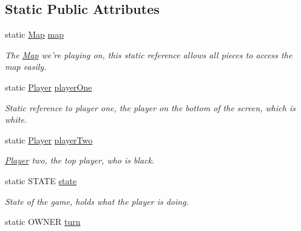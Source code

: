 \subsection*{Static Public Attributes}
\begin{DoxyCompactItemize}
\item 
\hypertarget{classapplication_1_1_game_a10619b2e871df9e6de819b032cbe1a4d}{static \hyperlink{classapplication_1_1_map}{Map} \hyperlink{classapplication_1_1_game_a10619b2e871df9e6de819b032cbe1a4d}{map}}\label{classapplication_1_1_game_a10619b2e871df9e6de819b032cbe1a4d}

\begin{DoxyCompactList}\small\item\em The \hyperlink{classapplication_1_1_map}{Map} we're playing on, this static reference allows all pieces to access the map easily. \end{DoxyCompactList}\item 
\hypertarget{classapplication_1_1_game_a08866c12070f0ef544abd8b9f1b6b0e5}{static \hyperlink{classapplication_1_1_player}{Player} \hyperlink{classapplication_1_1_game_a08866c12070f0ef544abd8b9f1b6b0e5}{player\+One}}\label{classapplication_1_1_game_a08866c12070f0ef544abd8b9f1b6b0e5}

\begin{DoxyCompactList}\small\item\em Static reference to player one, the player on the bottom of the screen, which is white. \end{DoxyCompactList}\item 
\hypertarget{classapplication_1_1_game_a31fcad6171766180e0eef67f71253532}{static \hyperlink{classapplication_1_1_player}{Player} \hyperlink{classapplication_1_1_game_a31fcad6171766180e0eef67f71253532}{player\+Two}}\label{classapplication_1_1_game_a31fcad6171766180e0eef67f71253532}

\begin{DoxyCompactList}\small\item\em \hyperlink{classapplication_1_1_player}{Player} two, the top player, who is black. \end{DoxyCompactList}\item 
\hypertarget{classapplication_1_1_game_adb74b89e0a6424ebcd5c5c13bb569e0c}{static S\+T\+A\+T\+E \hyperlink{classapplication_1_1_game_adb74b89e0a6424ebcd5c5c13bb569e0c}{state}}\label{classapplication_1_1_game_adb74b89e0a6424ebcd5c5c13bb569e0c}

\begin{DoxyCompactList}\small\item\em State of the game, holds what the player is doing. \end{DoxyCompactList}\item 
\hypertarget{classapplication_1_1_game_ad90cfa46ef32022357de71db5f1f7184}{static O\+W\+N\+E\+R \hyperlink{classapplication_1_1_game_ad90cfa46ef32022357de71db5f1f7184}{turn}}\label{classapplication_1_1_game_ad90cfa46ef32022357de71db5f1f7184}


\end{DoxyCompactItemize}
